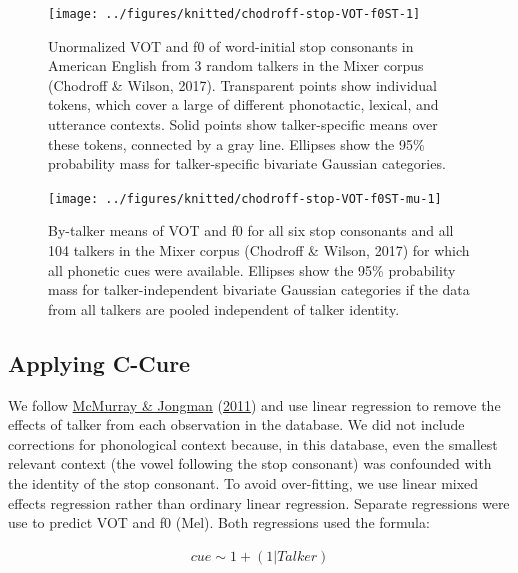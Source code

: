 \documentclass[
  11pt,
  english,
  man,floatsintext]{apa6}
\begin{document}
\begin{figure}

{\centering \texttt{[image: ../figures/knitted/chodroff-stop-VOT-f0ST-1]} 

}

\caption{Unormalized VOT and f0 of word-initial stop consonants in American English from 3 random talkers in the Mixer corpus (Chodroff \& Wilson, 2017). Transparent points show individual tokens, which cover a large of different phonotactic, lexical, and utterance contexts. Solid points show talker-specific means over these tokens, connected by a gray line. Ellipses show the 95\% probability mass for talker-specific bivariate Gaussian categories.}\label{fig:chodroff-stop-VOT-f0ST}
\end{figure}



\begin{figure}

{\centering \texttt{[image: ../figures/knitted/chodroff-stop-VOT-f0ST-mu-1]} 

}

\caption{By-talker means of VOT and f0 for all six stop consonants and all 104 talkers in the Mixer corpus (Chodroff \& Wilson, 2017) for which all phonetic cues were available. Ellipses show the 95\% probability mass for talker-independent bivariate Gaussian categories if the data from all talkers are pooled independent of talker identity.}\label{fig:chodroff-stop-VOT-f0ST-mu}
\end{figure}

\hypertarget{applying-c-cure}{%
\subsection{Applying C-Cure}\label{applying-c-cure}}

We follow \protect\hyperlink{ref-mcmurray-jongman2011}{McMurray \& Jongman} (\protect\hyperlink{ref-mcmurray-jongman2011}{2011}) and use linear regression to remove the effects of talker from each observation in the database. We did not include corrections for phonological context because, in this database, even the smallest relevant context (the vowel following the stop consonant) was confounded with the identity of the stop consonant. To avoid over-fitting, we use linear mixed effects regression rather than ordinary linear regression. Separate regressions were use to predict VOT and f0 (Mel). Both regressions used the formula:

\begin{equation}\label{eq:c-cure-regression}
\begin{split}
cue \sim 1 + (1 | Talker)
\end{split}
\end{equation}
\end{document}
